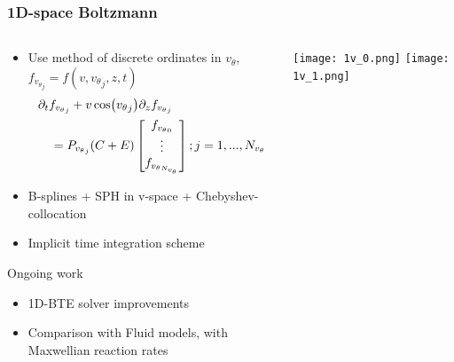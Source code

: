 \documentclass[mathserif, aspectratio=169]{beamer}
\newcommand{\vect}[1]{\boldsymbol{#1}}
\newcommand{\of}[1]{\mleft( #1 \mright)}
\newcommand{\vtheta}{{v_{\theta}}}
\begin{document}
\begin{frame}
	\frametitle{1D-space Boltzmann}
	\begin{columns}
		\begin{column}{0.6\textwidth}
			\begin{itemize}
				\item Use method of discrete ordinates in $\vtheta$, $f_{\vtheta_j} = f(v, \vtheta_j, z, t)$
				\begin{align*}
					\tiny
					&\partial_t f_{\vtheta_j} + v\cos\of{\vtheta_j} \partial_z f_{\vtheta_j} \nonumber \\
					&\quad = P_{\vtheta_j} (C + E) \begin{bmatrix}
						f_{\vtheta_0}\\
						\vdots\\
						f_{\vtheta_{N_\vtheta}}\\
					\end{bmatrix} ; j=1,..., N_{\vtheta}
					\label{eq:bte_discreate}
				\end{align*}
				\item B-splines + SPH in v-space +  Chebyshev-collocation %
				\item Implicit time integration scheme
			\end{itemize}
			Ongoing work
			\begin{itemize}
				\item 1D-BTE solver improvements
				\item Comparison with Fluid models, with Maxwellian reaction rates
			\end{itemize}
		\end{column}
		\begin{column}{0.4\textwidth}
			\vspace{-0.75in}
			\begin{center}
				\texttt{[image: 1v\_0.png]}
				\texttt{[image: 1v\_1.png]}
			\end{center}
		\end{column}
	\end{columns}
	
\end{frame}
\end{document}
